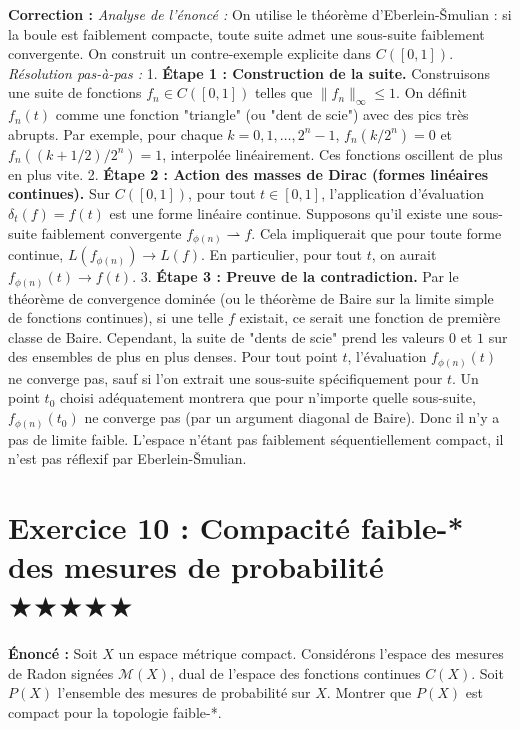 \documentclass[11pt,a4paper]{article}
\begin{document}
\textbf{Correction :}
\textit{Analyse de l'énoncé :} On utilise le théorème d'Eberlein-Šmulian : si la boule est faiblement compacte, toute suite admet une sous-suite faiblement convergente. On construit un contre-exemple explicite dans $C([0, 1])$.
\textit{Résolution pas-à-pas :}
1. \textbf{Étape 1 : Construction de la suite.}
   Construisons une suite de fonctions $f_n \in C([0, 1])$ telles que $\|f_n\|_\infty \le 1$.
   On définit $f_n(t)$ comme une fonction "triangle" (ou "dent de scie") avec des pics très abrupts.
   Par exemple, pour chaque $k = 0, 1, \dots, 2^n-1$, $f_n(k/2^n) = 0$ et $f_n((k+1/2)/2^n) = 1$, interpolée linéairement.
   Ces fonctions oscillent de plus en plus vite.
2. \textbf{Étape 2 : Action des masses de Dirac (formes linéaires continues).}
   Sur $C([0, 1])$, pour tout $t \in [0, 1]$, l'application d'évaluation $\delta_t(f) = f(t)$ est une forme linéaire continue.
   Supposons qu'il existe une sous-suite faiblement convergente $f_{\phi(n)} \rightharpoonup f$.
   Cela impliquerait que pour toute forme continue, $L(f_{\phi(n)}) \to L(f)$.
   En particulier, pour tout $t$, on aurait $f_{\phi(n)}(t) \to f(t)$.
3. \textbf{Étape 3 : Preuve de la contradiction.}
   Par le théorème de convergence dominée (ou le théorème de Baire sur la limite simple de fonctions continues), si une telle $f$ existait, ce serait une fonction de première classe de Baire.
   Cependant, la suite de "dents de scie" prend les valeurs $0$ et $1$ sur des ensembles de plus en plus denses. Pour tout point $t$, l'évaluation $f_{\phi(n)}(t)$ ne converge pas, sauf si l'on extrait une sous-suite spécifiquement pour $t$.
   Un point $t_0$ choisi adéquatement montrera que pour n'importe quelle sous-suite, $f_{\phi(n)}(t_0)$ ne converge pas (par un argument diagonal de Baire).
   Donc il n'y a pas de limite faible. L'espace n'étant pas faiblement séquentiellement compact, il n'est pas réflexif par Eberlein-Šmulian.


\section{Exercice 10 : Compacité faible-* des mesures de probabilité \quad $\bigstar\bigstar\bigstar\bigstar\bigstar$}

\textbf{Énoncé :}
Soit $X$ un espace métrique compact. Considérons l'espace des mesures de Radon signées $\mathcal{M}(X)$, dual de l'espace des fonctions continues $C(X)$. Soit $P(X)$ l'ensemble des mesures de probabilité sur $X$. Montrer que $P(X)$ est compact pour la topologie faible-*.
\end{document}
